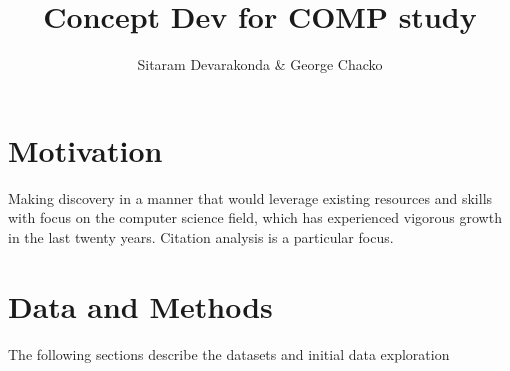 \documentclass[11pt, oneside]{article}   	%
\title{Concept Dev for COMP study}
\author{Sitaram Devarakonda \& George Chacko}
\begin{document}
\maketitle
\section{Motivation} Making discovery in a manner that would leverage existing resources and skills with focus on  the computer science field, which has experienced vigorous growth in the last twenty years. Citation analysis is a particular focus. 

\section{Data and Methods} The following sections describe the datasets and initial data exploration 
\end{document}
